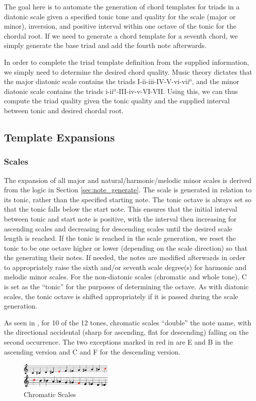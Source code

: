 \documentclass{article}
\begin{document}
The goal here is to automate the generation of chord templates for triads in a diatonic scale given a specified tonic tone and quality for the scale (major or minor), inversion, and positive interval within one octave of the tonic for the chordal root. If we need to generate a chord template for a seventh chord, we simply generate the base triad and add the fourth note afterwards. 

In order to complete the triad template definition from the supplied information, we simply need to determine the desired chord quality. Music theory dictates that the major diatonic scale contains the triads  I-ii-iii-IV-V-vi-vii$^\text{o}$, and the minor diatonic scale contains the triads i-ii$^\text{o}$-III-iv-v-VI-VII. Using this, we can thus compute the triad quality given the tonic quality and the supplied interval between tonic and desired chordal root.

\subsection{Template Expansions}
\subsubsection{Scales}
The expansion of all major and natural/harmonic/melodic minor scales is derived from the logic in Section \ref{sec:note_generate}. The scale is generated in relation to its tonic, rather than the specified starting note. The tonic octave is always set so that the tonic falls below the start note. This ensures that the initial interval between tonic and start note is positive, with the interval then increasing for ascending scales and decreasing for descending scales until the desired scale length is reached. If the tonic is reached in the scale generation, we reset the tonic to be one octave higher or lower (depending on the scale direction) so that the 
generating their notes. If needed, the notes are modified afterwards in order to appropriately raise the sixth and/or seventh scale degree(s) for harmonic and melodic minor scales. For the non-diatonic scales (chromatic and whole tone), C is set as the “tonic” for the purposes of determining the octave. As with diatonic scales, the tonic octave is shifted appropriately if it is passed during the scale generation.

As seen in , for 10 of the 12 tones, chromatic scales “double” the note name, with the directional accidental (sharp for ascending, flat for descending) falling on the second occurrence. The two exceptions marked in red in  are E and B in the ascending version and C and F for the descending version.
\vspace{-2mm}
\begin{figure}[h!]
\centering
\includegraphics[width=0.4\textwidth]{images/chromatic}
\caption{Chromatic Scales}
\label{chromatic}
\vspace{-3mm}
\end{figure}
\end{document}

